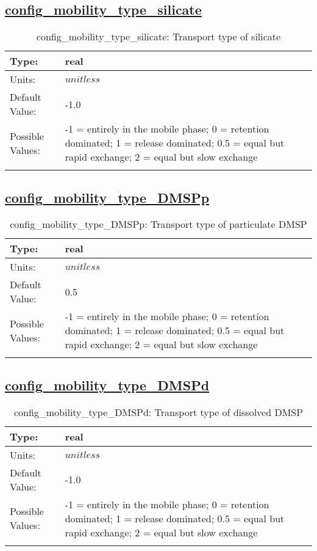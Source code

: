 \subsection[config\_mobility\_type\_silicate]{\hyperref[sec:nm_tab_biogeochemistry]{config\_mobility\_type\_silicate}}
\label{subsec:nm_sec_config_mobility_type_silicate}
\begin{center}
\begin{longtable}{| p{2.0in} || p{4.0in} |}
    \hline
    Type: & real \\
    \hline
    Units: & $unitless$ \\
    \hline
    Default Value: & -1.0 \\
    \hline
    Possible Values: & -1 = entirely in the mobile phase; 0 = retention dominated;     1 = release dominated; 0.5 = equal but rapid exchange;     2 = equal but slow exchange \\
    \hline
    \caption{config\_mobility\_type\_silicate: Transport type of silicate}
\end{longtable}
\end{center}
\subsection[config\_mobility\_type\_DMSPp]{\hyperref[sec:nm_tab_biogeochemistry]{config\_mobility\_type\_DMSPp}}
\label{subsec:nm_sec_config_mobility_type_DMSPp}
\begin{center}
\begin{longtable}{| p{2.0in} || p{4.0in} |}
    \hline
    Type: & real \\
    \hline
    Units: & $unitless$ \\
    \hline
    Default Value: & 0.5 \\
    \hline
    Possible Values: & -1 = entirely in the mobile phase; 0 = retention dominated;     1 = release dominated; 0.5 = equal but rapid exchange;     2 = equal but slow exchange \\
    \hline
    \caption{config\_mobility\_type\_DMSPp: Transport type of particulate DMSP}
\end{longtable}
\end{center}
\subsection[config\_mobility\_type\_DMSPd]{\hyperref[sec:nm_tab_biogeochemistry]{config\_mobility\_type\_DMSPd}}
\label{subsec:nm_sec_config_mobility_type_DMSPd}
\begin{center}
\begin{longtable}{| p{2.0in} || p{4.0in} |}
    \hline
    Type: & real \\
    \hline
    Units: & $unitless$ \\
    \hline
    Default Value: & -1.0 \\
    \hline
    Possible Values: & -1 = entirely in the mobile phase; 0 = retention dominated;     1 = release dominated; 0.5 = equal but rapid exchange;     2 = equal but slow exchange \\
    \hline
    \caption{config\_mobility\_type\_DMSPd: Transport type of dissolved DMSP}
\end{longtable}
\end{center}
